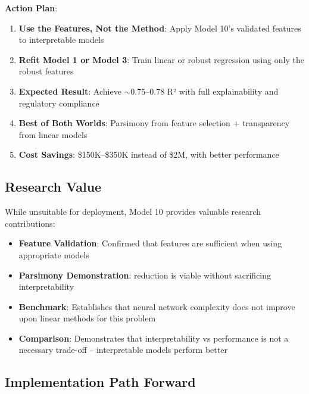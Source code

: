 \textbf{Action Plan}:

\begin{enumerate}
    \item \textbf{Use the Features, Not the Method}: Apply Model 10's \ModelTenRobustFeatures{} validated features to interpretable models
    
    \item \textbf{Refit Model 1 or Model 3}: Train linear or robust regression using only the \ModelTenRobustFeatures{} robust features
    
    \item \textbf{Expected Result}: Achieve $\sim$0.75--0.78 R² with full explainability and regulatory compliance
    
    \item \textbf{Best of Both Worlds}: Parsimony from feature selection + transparency from linear models
    
    \item \textbf{Cost Savings}: \$150K--\$350K instead of \$2M, with better performance
\end{enumerate}

\subsection{Research Value}

While unsuitable for deployment, Model 10 provides valuable research contributions:

\begin{itemize}
    \item \textbf{Feature Validation}: Confirmed that \ModelTenRobustFeatures{} features are sufficient when using appropriate models
    
    \item \textbf{Parsimony Demonstration}: \ModelTenFeatureReduction{} reduction is viable without sacrificing interpretability
    
    \item \textbf{Benchmark}: Establishes that neural network complexity does not improve upon linear methods for this problem
    
    \item \textbf{Comparison}: Demonstrates that interpretability vs performance is not a necessary trade-off -- interpretable models perform better
\end{itemize}

\subsection{Implementation Path Forward}

